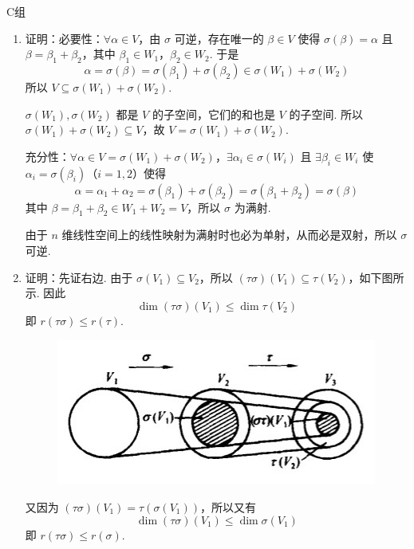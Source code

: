 \centerline{\heiti C组}
\begin{enumerate}
    \item 证明：必要性：$ \forall \alpha \in V $，由 $ \sigma $ 可逆，存在唯一的 $ \beta \in V $ 使得 $ \sigma(\beta) = \alpha $ 且 $ \beta = \beta_1 + \beta_2 $，其中 $ \beta_1 \in W_1 $，$ \beta_2 \in W_2 $. 于是
          \[ \alpha = \sigma(\beta) = \sigma(\beta_1) + \sigma(\beta_2) \in \sigma(W_1) + \sigma(W_2) \]
          所以 $ V \subseteq \sigma(W_1) + \sigma(W_2) $.

          $ \sigma(W_1), \sigma(W_2) $ 都是 $ V $ 的子空间，它们的和也是 $ V $ 的子空间. 所以 $ \sigma(W_1) + \sigma(W_2) \subseteq V $，故 $ V = \sigma(W_1) + \sigma(W_2) $.

          充分性：$ \forall \alpha \in V = \sigma(W_1) + \sigma(W_2) $，$ \exists \alpha_i \in \sigma(W_i) $ 且 $ \exists \beta_i \in W_i $ 使 $ \alpha_i = \sigma(\beta_i) $（$ i = 1, 2 $）使得
          \[ \alpha = \alpha_1 + \alpha_2 = \sigma(\beta_1) + \sigma(\beta_2) = \sigma(\beta_1 + \beta_2) = \sigma(\beta) \]
          其中 $ \beta = \beta_1 + \beta_2 \in W_1 + W_2 = V $，所以 $ \sigma $ 为满射.

          由于 $ n $ 维线性空间上的线性映射为满射时也必为单射，从而必是双射，所以 $ \sigma $ 可逆.

    \item 证明：先证右边. 由于 $ \sigma(V_1) \subseteq V_2 $，所以 $ (\tau \sigma)(V_1) \subseteq \tau(V_2) $，如下图所示. 因此
          \[ \dim(\tau \sigma)(V_1) \leqslant \dim \tau(V_2) \]
          即 $ r(\tau \sigma) \leqslant r(\tau) $.
          \begin{figure}[H]
              \centering
              \includegraphics[scale=.5]{figs/6C.2.1.jpg}
          \end{figure}
          又因为 $ (\tau \sigma)(V_1) = \tau(\sigma(V_1)) $，所以又有
          \[ \dim(\tau \sigma)(V_1) \leqslant \dim \sigma(V_1) \]
          即 $ r(\tau \sigma) \leqslant r(\sigma) $.


\end{enumerate}
